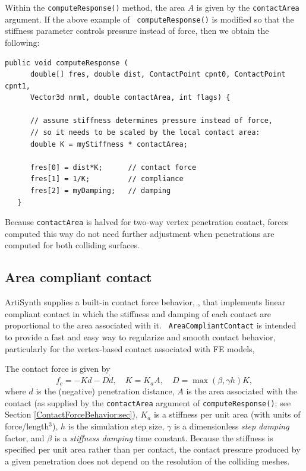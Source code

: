 Within the {\tt computeResponse()} method, the area $A$ is given by the
{\tt contactArea} argument. If the above example of {\tt
computeResponse()} is modified so that the stiffness parameter
controls pressure instead of force, then we obtain the following:
%
\begin{lstlisting}[]
   public void computeResponse (
      double[] fres, double dist, ContactPoint cpnt0, ContactPoint cpnt1, 
      Vector3d nrml, double contactArea, int flags) {

      // assume stiffness determines pressure instead of force,
      // so it needs to be scaled by the local contact area:
      double K = myStiffness * contactArea;

      fres[0] = dist*K;      // contact force
      fres[1] = 1/K;         // compliance
      fres[2] = myDamping;   // damping
   }
\end{lstlisting}
%

Because {\tt contactArea} is halved for two-way vertex penetration
contact, forces computed this way do not need further adjustment
when penetrations are computed for both colliding surfaces.

\subsection{Area compliant contact}
\label{AreaCompliantContact:sec}

ArtiSynth supplies a built-in contact force behavior,
, that
implements linear compliant contact in which the stiffness and damping of each
contact are proportional to the area associated with it.  {\tt
AreaCompliantContact} is intended to provide a fast and easy way to regularize
and smooth contact behavior, particularly for the vertex-based contact
associated with FE models,

The contact force is given by
%
\begin{equation}
f_c = - K d - D \dot d, \quad K = K_a A, \quad
D = \max (\beta, \gamma h) K,
\label{areaCompliantContact:eqn}
\end{equation}
%
where $d$ is the (negative) penetration distance, $A$ is the area
associated with the contact (as supplied by the {\tt contactArea}
argument of {\tt computeResponse()}; see Section
\ref{ContactForceBehavior:sec}), $K_a$ is a stiffness per unit area
(with units of force/length$^3$), $h$ is the simulation step size,
$\gamma$ is a dimensionless {\it step damping} factor, and $\beta$ is
a {\it stiffness damping} time constant. Because the stiffness is specified per unit area rather than per
contact, the contact pressure produced by a given penetration does not
depend on the resolution of the colliding meshes.

